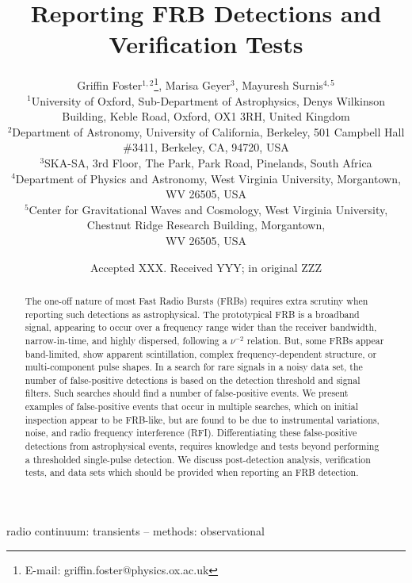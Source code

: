 \documentclass[a4paper,fleqn,usenatbib]{mnras}
\title[FRB Detections and Verification Tests]{Reporting FRB Detections
and Verification Tests}
\author[G. Foster et al.]{
Griffin Foster$^{1,2}$\thanks{E-mail: griffin.foster@physics.ox.ac.uk},
Marisa Geyer$^{3}$,
Mayuresh Surnis$^{4,5}$
\\
$^{1}$University of Oxford, Sub-Department of Astrophysics, Denys Wilkinson Building, Keble Road, Oxford, OX1 3RH, United Kingdom\\
$^{2}$Department of Astronomy, University of California, Berkeley, 501 Campbell
Hall \#3411, Berkeley, CA, 94720, USA\\
$^{3}$SKA-SA, 3rd Floor, The Park, Park Road, Pinelands, South Africa\\
$^{4}$Department of Physics and Astronomy, West Virginia University, Morgantown, WV 26505, USA\\
$^{5}$Center for Gravitational Waves and Cosmology, West Virginia University, Chestnut Ridge Research Building, Morgantown,\\ WV 26505, USA\\
}
\date{Accepted XXX. Received YYY; in original ZZZ}
\begin{document}
\label{firstpage}
\pagerange{\pageref{firstpage}--\pageref{lastpage}}
\maketitle



\begin{abstract}
The one-off nature of most Fast Radio Bursts (FRBs) requires extra scrutiny when
reporting such detections as astrophysical.  The prototypical FRB is a broadband
signal, appearing to occur over a frequency range wider than the receiver
bandwidth, narrow-in-time, and highly dispersed, following a $\nu^{-2}$
relation.  But, some FRBs appear band-limited, show apparent scintillation,
complex frequency-dependent structure, or multi-component pulse shapes.  In a
search for rare signals in a noisy data set, the number of false-positive
detections is based on the detection threshold and signal filters.  Such
searches should find a number of false-positive events.  We present examples of
false-positive events that occur in multiple searches, which on initial
inspection appear to be FRB-like, but are found to be due to instrumental
variations, noise, and radio frequency interference (RFI).  Differentiating
these false-positive detections from astrophysical events, requires knowledge
and tests beyond performing a thresholded single-pulse detection.  We discuss
post-detection analysis, verification tests, and data sets which should be
provided when reporting an FRB detection.
\end{abstract}

\begin{keywords}
radio continuum: transients -- methods: observational
\end{keywords}
\end{document}
